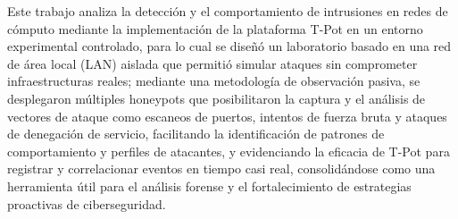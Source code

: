 Este trabajo analiza la detección y el comportamiento de intrusiones en redes de cómputo mediante la implementación de la plataforma T-Pot en un entorno experimental controlado, para lo cual se diseñó un laboratorio basado en una red de área local (LAN) aislada que permitió simular ataques sin comprometer infraestructuras reales; mediante una metodología de observación pasiva, se desplegaron múltiples honeypots que posibilitaron la captura y el análisis de vectores de ataque como escaneos de puertos, intentos de fuerza bruta y ataques de denegación de servicio, facilitando la identificación de patrones de comportamiento y perfiles de atacantes, y evidenciando la eficacia de T-Pot para registrar y correlacionar eventos en tiempo casi real, consolidándose como una herramienta útil para el análisis forense y el fortalecimiento de estrategias proactivas de ciberseguridad.